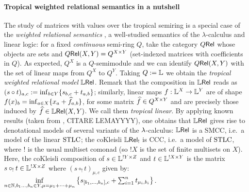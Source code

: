 \documentclass[submission,%
]{eptcs}
\begin{document}
\paragraph{Tropical weighted relational semantics in a nutshell}

The study of matrices with values over the tropical semiring is a special case of the
\emph{weighted relational semantics} \cite{Manzo2013}, a well-studied semantics of the $\lambda$-calculus and linear logic:
for a fixed \emph{continuous} semi-ring $Q$, take the category $Q \mathsf{Rel}$ whose objects are sets and ${Q \mathsf{Rel}}(X,Y)=Q^{X\times Y}$ (set-indexed matrices with coefficients in $Q$). %
As expected, $Q^X$ is a $Q$-semimodule and we can identify ${Q \mathsf{Rel}}(X,Y)$ with the set of linear maps from $Q^X$ to $Q^Y$.
Taking $Q:=\mathbb{L}$ we obtain the \emph{tropical weighted relational model} $\mathbb{L} \mathsf{Rel}$.
Remark that the composition in $\mathbb{L} \mathsf{Rel}$ %
reads as \ $(s\circ t)_{a,c}:=\inf_{b\in Y}\{s_{b,c}+t_{a,b}\}$;
similarly, linear maps $f:\mathbb{L}^X\to \mathbb{L}^Y$ are of shape $f(x)_b=\inf_{a\in X} \{x_a+\widehat{f}_{a,b}\}$, for some matrix $\widehat{f}\in Q^{X\times Y}$ and are precisely those induced by $\widehat{f}\in{\mathbb{L}\mathsf{Rel}}(X,Y)$. We call them \emph{tropical linear}.
By applying known results (taken from \cite{Manzo2013},  {\color{red}CITARE LEMAYYYY}), one obtains that $\mathbb{L} \mathsf{Rel}$ gives rise to denotational models of several variants of the $\lambda$-calculus:
$\mathbb{L} \mathsf{Rel}$ is a SMCC, i.e.\ a model of the linear $\mathrm{STLC}$;
the coKleisli $\mathbb{L} \mathsf{Rel}_!$ is CCC, i.e.\ a model of $\mathrm{STLC}$, where $!$ is the usual multiset comonad (so $!X$ is the set of finite multisets on $X$).
Here, the coKleisli composition of $s\in\mathbb{L}^{!Y\times Z}$ and $t\in\mathbb{L}^{!X\times Y}$ is the matrix $s\circ_! t\in\mathbb{L}^{!X\times Z}$ where $(s\circ_! t)_{\mu,c}$ given by:
$
 \inf\limits_{n\in\mathbb{N}, b_1\dots,b_n\in Y, \mu = \mu_1+\cdots +\mu_n}
 \left\{s_{[b_1,\dots,b_n],c} + \sum_{i=1}^n t_{\mu_i,b_i}\right\}$.
\end{document}
